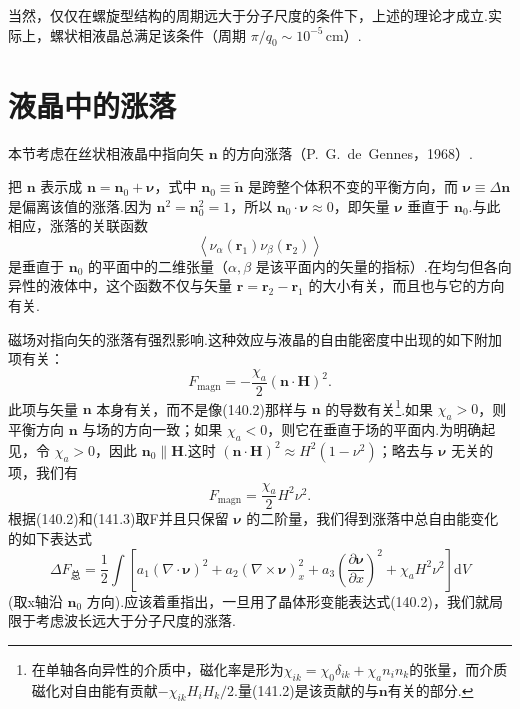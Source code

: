 当然，仅仅在螺旋型结构的周期远大于分子尺度的条件下，上述的理论才成立.实际上，螺状相液晶总满足该条件（周期 $\pi/q_0\sim10^{-5}\,\mathrm{cm}$）.

\section{液晶中的涨落}

本节考虑在丝状相液晶中指向矢 $\boldsymbol{n}$ 的方向涨落（P.~G.~de~Gennes，1968）.

把 $\boldsymbol{n}$ 表示成 $\boldsymbol{n}=\boldsymbol{n}_0+\boldsymbol{\nu}$，式中 $\boldsymbol{n}_0\equiv\tilde{\boldsymbol{n}}$ 是跨整个体积不变的平衡方向，而 $\boldsymbol{\nu}\equiv\Delta\boldsymbol{n}$ 是偏离该值的涨落.因为 $\boldsymbol{n}^2=\boldsymbol{n}_0^2=1$，所以 $\boldsymbol{n}_0\cdot\boldsymbol{\nu}\approx0$，即矢量 $\boldsymbol{\nu}$ 垂直于 $\boldsymbol{n}_0$.与此相应，涨落的关联函数
\begin{equation}
  \left\langle\nu_\alpha(\boldsymbol{r}_1)\nu_\beta(\boldsymbol{r}_2)\right\rangle
\end{equation}
是垂直于 $\boldsymbol{n}_0$ 的平面中的二维张量（$\alpha,\beta$ 是该平面内的矢量的指标）.在均匀但各向异性的液体中，这个函数不仅与矢量 $\boldsymbol{r}=\boldsymbol{r}_2-\boldsymbol{r}_1$ 的大小有关，而且也与它的方向有关.

磁场对指向矢的涨落有强烈影响.这种效应与液晶的自由能密度中出现的如下附加项有关：
\begin{equation}
  F_{\mathrm{magn}}=-\frac{\chi_a}{2}(\boldsymbol{n}\cdot\boldsymbol{H})^2.
\end{equation}
此项与矢量 $\boldsymbol{n}$ 本身有关，而不是像(140.2)那样与 $\boldsymbol{n}$ 的导数有关\footnote{在单轴各向异性的介质中，磁化率是形为$\chi_{ik}=\chi_0\delta_{ik}+\chi_a n_i n_k$的张量，而介质磁化对自由能有贡献$-\chi_{ik}H_iH_k/2$.量(141.2)是该贡献的与$\boldsymbol{n}$有关的部分.}.如果 $\chi_a>0$，则平衡方向 $\boldsymbol{n}$ 与场的方向一致；如果 $\chi_a<0$，则它在垂直于场的平面内.为明确起见，令 $\chi_a>0$，因此 $\boldsymbol{n}_0\parallel\boldsymbol{H}$.这时 $(\boldsymbol{n}\cdot\boldsymbol{H})^2\approx H^2(1-\nu^2)$；略去与 $\boldsymbol{\nu}$ 无关的项，我们有
\begin{equation}
  F_{\mathrm{magn}}=\frac{\chi_a}{2}H^2\nu^2.
\end{equation}
根据(140.2)和(141.3)取F并且只保留 $\boldsymbol{\nu}$ 的二阶量，我们得到涨落中总自由能变化的如下表达式
\begin{equation}
  \Delta F_{\text{总}}=\frac{1}{2}\int\left[a_1(\nabla\cdot\boldsymbol{\nu})^2
  +a_2(\nabla\times\boldsymbol{\nu})_x^2
  +a_3\left(\frac{\partial\boldsymbol{\nu}}{\partial x}\right)^2
  +\chi_aH^2\nu^2\right]\mathrm{d}V
\end{equation}
(取x轴沿 $\boldsymbol{n}_0$ 方向).应该着重指出，一旦用了晶体形变能表达式(140.2)，我们就局限于考虑波长远大于分子尺度的涨落.

